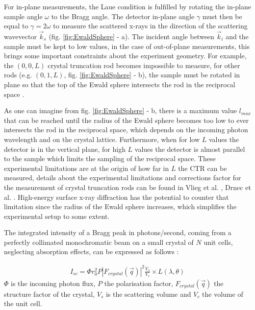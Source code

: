 For in-plane measurements, the Laue condition is fulfilled by rotating the in-plane sample angle $\omega$ to the Bragg angle.
The detector in-plane angle $\gamma$ must then be equal to $\gamma = 2 \omega$ to measure the scattered x-rays in the direction of the scattering wavevector $\vec{k}_s$ (fig. \ref{fig:EwaldSphere} - a).
The incident angle between $\vec{k}_i$ and the sample must be kept to low values, in the case of out-of-plane measurements, this brings some important constraints about the experiment geometry.
For example, the $(0, 0, L)$ crystal truncation rod becomes impossible to measure, for other rods (e.g. $(0, 1, L)$, fig. \ref{fig:EwaldSphere} - b), the sample must be rotated in plane so that the top of the Ewald sphere intersects the rod in the reciprocal space \parencite{Vlieg1997, Schleputz2005}.

As one can imagine from fig. \ref{fig:EwaldSphere} - b, there is a maximum value $l_{max}$ that can be reached until the radius of the Ewald sphere becomes too low to ever intersects the rod in the reciprocal space, which depends on the incoming photon wavelength and on the crystal lattice.
Furthermore, when for low $L$ values the detector is in the vertical plane, for high $L$ values the detector is almost parallel to the sample which limits the sampling of the reciprocal space.
These experimental limitations are at the origin of how far in $L$ the CTR can be measured, details about the experimental limitations and corrections factor for the measurement of crystal truncation rods can be found in Vlieg et al. \parencite*{Vlieg1997}, Drnec et al. \parencite*{Drnec2014}.
High-energy surface x-ray diffraction \parencite{Gustafson2014, Harlow2020, Hejral2021} has the potential to counter that limitation since the radius of the Ewald sphere increases, which simplifies the experimental setup to some extent.

The integrated intensity of a Bragg peak in photons/second, coming from a perfectly collimated monochromatic beam on a small crystal of $N$ unit cells, neglecting absorption effects, can be expressed as follows \parencite{NielsenMcMorrow}:

\begin{gather}
    \label{eq:ScatteredIntensity}
    I_{sc} = \Phi r_0^2 P |F_{crystal}(\vec{q})|^2 \frac{V_s}{V_c} \times L(\lambda, \theta)
\end{gather}
$\Phi$ is the incoming photon flux, $P$ the polarisation factor, $F_{crystal}(\vec{q})$ the structure factor of the crystal, $V_s$ is the scattering volume and $V_c$ the volume of the unit cell.

